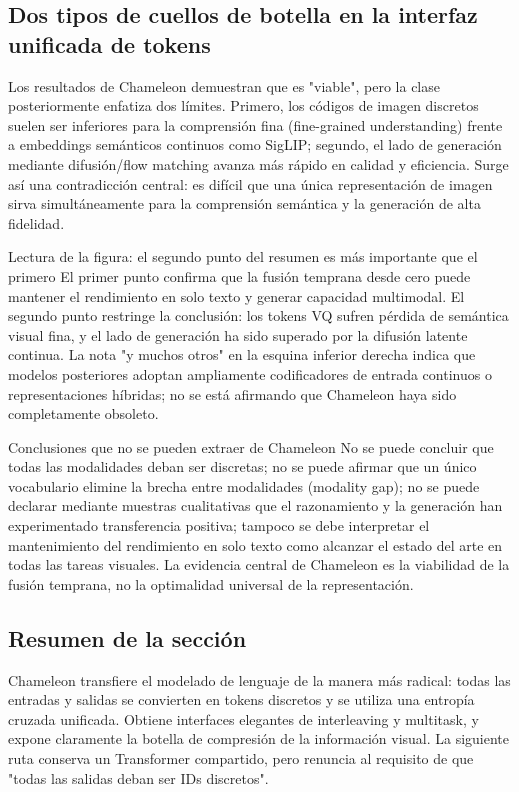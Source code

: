\subsection{Dos tipos de cuellos de botella en la interfaz unificada de tokens}

Los resultados de Chameleon demuestran que es "viable", pero la clase posteriormente enfatiza dos límites. Primero, los códigos de imagen discretos suelen ser inferiores para la comprensión fina (fine-grained understanding) frente a embeddings semánticos continuos como SigLIP; segundo, el lado de generación mediante difusión/flow matching avanza más rápido en calidad y eficiencia. Surge así una contradicción central: es difícil que una única representación de imagen sirva simultáneamente para la comprensión semántica y la generación de alta fidelidad.


\begin{knowledgebox}{Lectura de la figura: el segundo punto del resumen es más importante que el primero}
El primer punto confirma que la fusión temprana desde cero puede mantener el rendimiento en solo texto y generar capacidad multimodal. El segundo punto restringe la conclusión: los tokens VQ sufren pérdida de semántica visual fina, y el lado de generación ha sido superado por la difusión latente continua. La nota "y muchos otros" en la esquina inferior derecha indica que modelos posteriores adoptan ampliamente codificadores de entrada continuos o representaciones híbridas; no se está afirmando que Chameleon haya sido completamente obsoleto.
\end{knowledgebox}

\begin{warningbox}{Conclusiones que no se pueden extraer de Chameleon}
No se puede concluir que todas las modalidades deban ser discretas; no se puede afirmar que un único vocabulario elimine la brecha entre modalidades (modality gap); no se puede declarar mediante muestras cualitativas que el razonamiento y la generación han experimentado transferencia positiva; tampoco se debe interpretar el mantenimiento del rendimiento en solo texto como alcanzar el estado del arte en todas las tareas visuales. La evidencia central de Chameleon es la viabilidad de la fusión temprana, no la optimalidad universal de la representación.
\end{warningbox}

\subsection{Resumen de la sección}

Chameleon transfiere el modelado de lenguaje de la manera más radical: todas las entradas y salidas se convierten en tokens discretos y se utiliza una entropía cruzada unificada. Obtiene interfaces elegantes de interleaving y multitask, y expone claramente la botella de compresión de la información visual. La siguiente ruta conserva un Transformer compartido, pero renuncia al requisito de que "todas las salidas deban ser IDs discretos".



